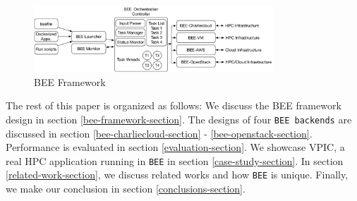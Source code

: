 \begin{figure}[t]
    \centering
    \includegraphics[width=0.8\textwidth]{figures/bee-framework.pdf}
    \caption{BEE Framework}
    \label{bee-framework}
\end{figure} 


The rest of this paper is organized as follows:  
We discuss the BEE framework design in section \ref{bee-framework-section}. The designs of four \texttt{BEE backends} are discussed in section \ref{bee-charliecloud-section} - \ref{bee-openstack-section}. Performance is evaluated in section \ref{evaluation-section}. We showcase VPIC, a real HPC application running in \texttt{BEE} in section \ref{case-study-section}. In section \ref{related-work-section}, we discuss related works and how \texttt{BEE} is unique. Finally, we make our conclusion in section \ref{conclusions-section}.





